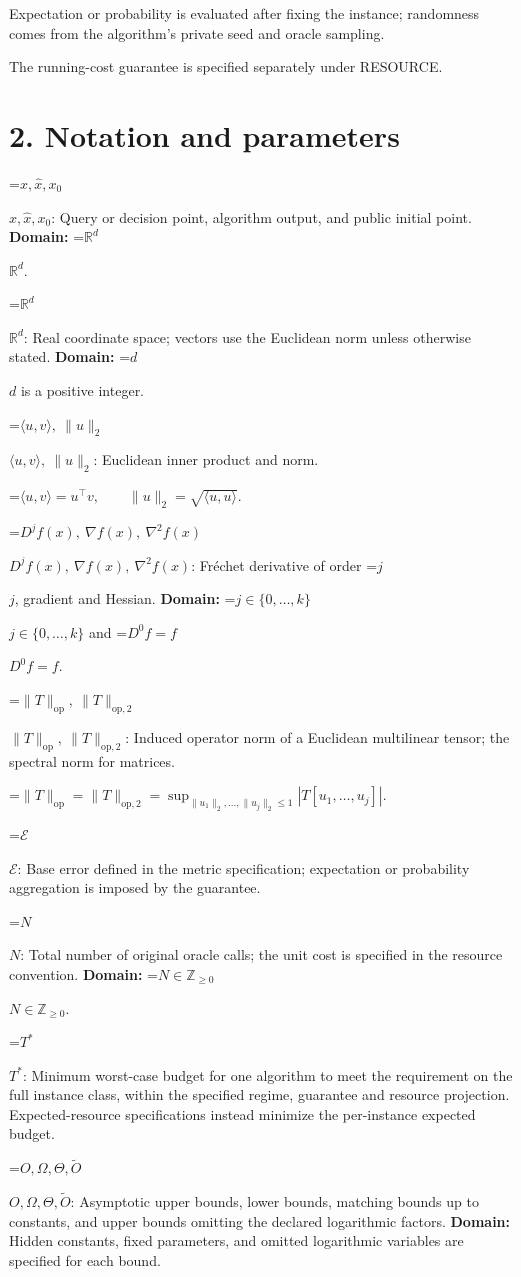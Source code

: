 \documentclass[10pt,a4paper]{article}
\newcommand{\AtlasMath}[1]{\par\begingroup\centering\setbox0=\hbox{$\displaystyle #1$}\ifdim\wd0>1.4\linewidth\typeout{ATLAS WIDE FORMULA: \the\wd0}\fi\ifdim\wd0>\linewidth\resizebox{\linewidth}{!}{\box0}\else\box0\fi\par\endgroup}
\newcommand{\AtlasInlineMath}[1]{\begingroup\setbox0=\hbox{$#1$}\ifdim\wd0>.4\linewidth\endgroup\AtlasMath{#1}\else\endgroup$#1$\fi}
\begin{document}
Expectation or probability is evaluated after fixing the instance; randomness comes from the algorithm's private seed and oracle sampling.

The running-cost guarantee is specified separately under RESOURCE.

\section{2. Notation and parameters}
\AtlasInlineMath{x,\widehat{x},x_0}: Query or decision point, algorithm output, and public initial point. \textbf{Domain:} \AtlasInlineMath{\mathbb{R}^d}.

\AtlasInlineMath{\mathbb{R}^d}: Real coordinate space; vectors use the Euclidean norm unless otherwise stated. \textbf{Domain:} \AtlasInlineMath{d} is a positive integer.

\AtlasInlineMath{\langle u,v\rangle,\ \|u\|_2}: Euclidean inner product and norm.


\AtlasMath{\langle u,v\rangle=u^\top v,\qquad\|u\|_2=\sqrt{\langle u,u\rangle}.}


\AtlasInlineMath{D^jf(x),\ \nabla f(x),\ \nabla^2f(x)}: Fréchet derivative of order \AtlasInlineMath{j}, gradient and Hessian. \textbf{Domain:} \AtlasInlineMath{j\in\{0,\ldots,k\}} and \AtlasInlineMath{D^0f=f}.

\AtlasInlineMath{\|T\|_{\mathrm{op}},\ \|T\|_{\mathrm{op},2}}: Induced operator norm of a Euclidean multilinear tensor; the spectral norm for matrices.


\AtlasMath{\|T\|_{\mathrm{op}}=\|T\|_{\mathrm{op},2}=\sup_{\|u_1\|_2,\ldots,\|u_j\|_2\le1}|T[u_1,\ldots,u_j]|.}


\AtlasInlineMath{\mathcal{E}}: Base error defined in the metric specification; expectation or probability aggregation is imposed by the guarantee.

\AtlasInlineMath{N}: Total number of original oracle calls; the unit cost is specified in the resource convention. \textbf{Domain:} \AtlasInlineMath{N\in\mathbb{Z}_{\ge0}}.

\AtlasInlineMath{T^*}: Minimum worst-case budget for one algorithm to meet the requirement on the full instance class, within the specified regime, guarantee and resource projection. Expected-resource specifications instead minimize the per-instance expected budget.

\AtlasInlineMath{O,\Omega,\Theta,\widetilde{O}}: Asymptotic upper bounds, lower bounds, matching bounds up to constants, and upper bounds omitting the declared logarithmic factors. \textbf{Domain:} Hidden constants, fixed parameters, and omitted logarithmic variables are specified for each bound.
\end{document}
